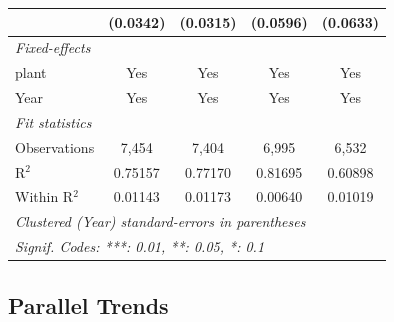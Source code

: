\documentclass[
  12pt]{article}
\theoremstyle{definition}
\theoremstyle{remark}
\begin{document}
\begin{table}
\begin{minipage}{\linewidth}
\begin{tabular}{lcccc}
                                                           & (0.0342)               & (0.0315)             & (0.0596)            & (0.0633)\\   
   \midrule
   \emph{Fixed-effects}\\
   plant                                                   & Yes                    & Yes                  & Yes                 & Yes\\  
   Year                                                    & Yes                    & Yes                  & Yes                 & Yes\\  
   \midrule
   \emph{Fit statistics}\\
   Observations                                            & 7,454                  & 7,404                & 6,995               & 6,532\\  
   R$^2$                                                   & 0.75157                & 0.77170              & 0.81695             & 0.60898\\  
   Within R$^2$                                            & 0.01143                & 0.01173              & 0.00640             & 0.01019\\  
   \midrule \midrule
   \multicolumn{5}{l}{\emph{Clustered (Year) standard-errors in parentheses}}\\
   \multicolumn{5}{l}{\emph{Signif. Codes: ***: 0.01, **: 0.05, *: 0.1}}\\
\end{tabular}
\par\endgroup

\end{minipage}%

\end{table}%

\subsection{Parallel Trends}\label{parallel-trends}
\end{document}
